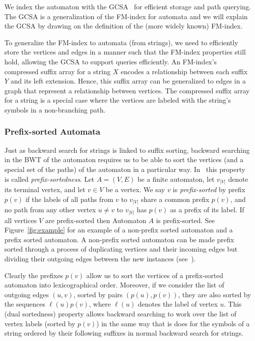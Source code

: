 We index the automaton with the GCSA~\cite{dag_method} for efficient storage and path querying.  The GCSA is a generalization of the FM-index for automata and
we will explain the GCSA by drawing on the definition of the (more widely known) FM-index.

To generalize the FM-index to automata (from strings), we need to efficiently store the vertices and edges in a manner such that the FM-index properties still hold, allowing the GCSA to support queries efficiently.  An FM-index's compressed suffix array for a string $X$ encodes a relationship between each suffix $Y$ and its left extension.  Hence, this suffix array can be generalized to edges in a graph that represent a relationship between vertices.  The compressed suffix array for a string is a special case where the vertices are labeled with the string's symbols in a non-branching path.

\subsubsection{Prefix-sorted Automata}
Just as backward search for strings is linked to suffix sorting, backward searching in the BWT of the automaton
requires us to be able to sort the vertices (and a special set of the paths) of the automaton in a particular
way. In~\cite{dag_method} this property is called {\em prefix-sortedness}. Let $A = (V,E)$ be a finite automaton,
let $v_{|V|}$ denote its terminal vertex, and let $v \in V$ be a vertex. We say $v$ is {\em prefix-sorted} by
prefix $p(v)$ if the labels of all paths from $v$ to $v_{|V|}$ share a common prefix $p(v)$, and no path from any
other vertex $u \ne v$ to $v_{|V|}$ has $p(v)$ as a prefix of its label. If all
vertices $V$ are prefix-sorted then Automaton $A$ is prefix-sorted. See Figure~\ref{fig:example} for an example of a non-prefix sorted automaton and a
prefix sorted automaton. A non-prefix sorted automaton can be made prefix sorted through a process of duplicating
vertices and their incoming edges but dividing their outgoing edges between the new instances (see~\cite{dag_method}).

Clearly the prefixes $p(v)$ allow us to sort the vertices of a prefix-sorted automaton into lexicographical
order. Moreover, if we consider the list of outgoing edges $(u,v)$, sorted by pairs $(p(u),p(v))$, they are
also sorted by the sequences $\ell(u)p(v)$, where $\ell(u)$ denotes the label of vertex $u$. This (dual sortedness)
property allows backward searching to work over the list of vertex labels (sorted by $p(v)$) in the same way
that is does for the symbols of a string ordered by their following suffixes in normal backward search for
strings.

